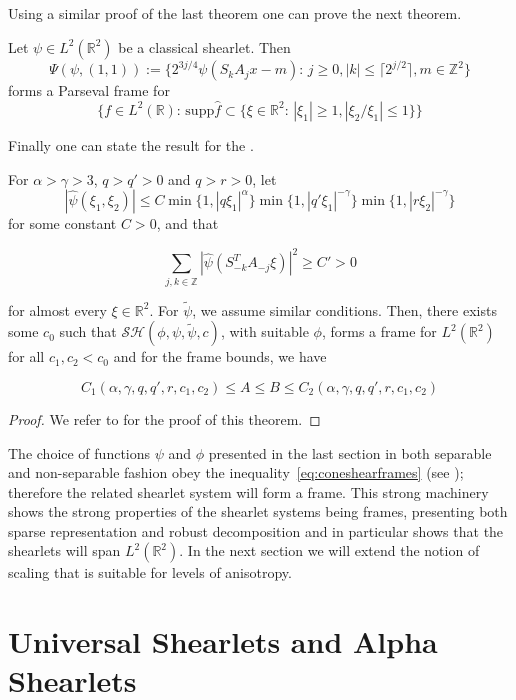 Using a similar proof of the last theorem one can prove the next theorem.

\begin{thm}
Let $\psi\in L^2(\mathbb{R}^2)$ be a classical shearlet. Then 
$$
\Psi(\psi,(1,1)):=\{2^{3j/4}\psi(S_kA_jx-m)\text{: }j\geq 0,|k|\leq\lceil 2^{j/2}\rceil,m\in\mathbb{Z}^2\}
$$
forms a Parseval frame for 
$$
\{f\in L^2(\mathbb{R})\text{:  supp}\hat{f}\subset\{\xi\in\mathbb{R}^2\text{:  }|\xi_1|\geq 1,|\xi_2/\xi_1|\leq 1\}\}
$$
\end{thm}

Finally one can state the result for the .

\begin{thm}
For $\alpha >\gamma>3$, $q>q'>0$ and $q>r>0$, let 
\begin{equation}
\label{eq:coneshearframes}
|\hat{\psi}(\xi_1,\xi_2)|\leq C\min\{1,|q\xi_1|^{\alpha}\}\min\{1,|q'\xi_1|^{-\gamma}\}\min\{1,|r\xi_2|^{-\gamma}\}
\end{equation}
for some constant $C>0$, and that

$$
\sum_{j,k\in\mathbb{Z}}|\hat{\psi}(S^T_{-k}A_{-j}\xi)|^2\geq C'>0
$$

for almost every $\xi\in\mathbb{R}^2$. For $\tilde{\psi}$, we assume similar conditions. Then, there exists some $c_0$ such that $\mathcal{SH}(\phi,\psi,\tilde{\psi},c)$, with suitable $\phi$, forms a frame for $L^2(\mathbb{R}^2)$ for all $c_1,c_2<c_0$ and for the frame bounds, we have 

$$
C_1(\alpha,\gamma,q,q',r,c_1,c_2)\leq A\leq B\leq C_2(\alpha,\gamma,q,q',r,c_1,c_2)
$$

\end{thm}
\begin{proof}
We refer to \cite{FirstShearlets} for the proof of this theorem. 
\end{proof}

The choice of functions $\psi$ and $\phi$ presented in the last section in both separable and non-separable fashion obey the inequality~\ref{eq:coneshearframes} (see \cite{Nonseparableshear}); therefore the related shearlet system will form a frame. This strong machinery shows the strong properties of the shearlet systems being frames, presenting both sparse representation and robust decomposition and in particular shows that the shearlets will span $L^2(\mathbb{R}^2)$. In the next section we will extend the notion of scaling that is suitable for levels of anisotropy. 

\section{Universal Shearlets and Alpha Shearlets}
\label{sec:AlphaShearlets}

